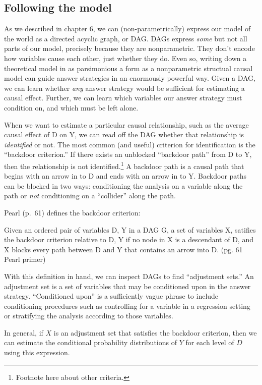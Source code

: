 \documentclass[
]{article}
\begin{document}
\hypertarget{following-the-model}{%
\subsection{Following the model}\label{following-the-model}}

As we described in chapter 6, we can (non-parametrically) express our
model of the world as a directed acyclic graph, or DAG. DAGs express
\emph{some} but not all parts of our model, precisely because they are
nonparametric. They don't encode how variables cause each other, just
whether they do. Even so, writing down a theoretical model in as
parsimonious a form as a nonparametric structual causal model can guide
answer strategies in an enormously powerful way. Given a DAG, we can
learn whether \emph{any} answer strategy would be sufficient for
estimating a causal effect. Further, we can learn which variables our
answer strategy must condition on, and which must be left alone.

When we want to estimate a particular causal relationship, such as the
average causal effect of D on Y, we can read off the DAG whether that
relationship is \emph{identified} or not. The most common (and useful)
criterion for identification is the ``backdoor criterion.'' If there
exists an unblocked ``backdoor path'' from D to Y, then the relationship
is not identified.\footnote{Footnote here about other criteria.} A
backdoor path is a causal path that begins with an arrow in to D and
ends with an arrow in to Y. Backdoor paths can be blocked in two ways:
conditioning the analysis on a variable along the path or \emph{not}
conditioning on a ``collider'' along the path.

Pearl (p.~61) defines the backdoor criterion:

Given an ordered pair of variables D, Y in a DAG G, a set of variables
X, satifies the backdoor criterion relative to D, Y if no node in X is a
descendant of D, and X blocks every path between D and Y that contains
an arrow into D. (pg. 61 Pearl primer)

With this definition in hand, we can inspect DAGs to find ``adjustment
sets.'' An adjustment set is a set of variables that may be conditioned
upon in the answer strategy. ``Conditioned upon'' is a sufficiently
vague phrase to include conditioning procedures such as controlling for
a variable in a regression setting or stratifying the analysis according
to those variables.

In general, if \(X\) is an adjustment set that satisfies the backdoor
criterion, then we can estimate the conditional probability
distributions of \(Y\) for each level of \(D\) using this expression.
\end{document}
